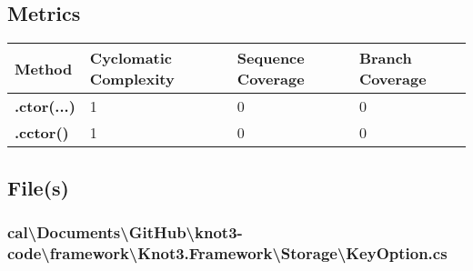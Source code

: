 \documentclass[a4paper,10pt]{article}
\begin{document}
\subsection{Metrics}
\begin{longtable}[l]{|l|l|l|l|}
\hline
\textbf{Method} & \textbf{Cyclomatic Complexity} & \textbf{Sequence Coverage} & \textbf{Branch Coverage}\\
\hline
\textbf{.ctor(...)} & 1 & 0 & 0\\
\hline
\textbf{.cctor()} & 1 & 0 & 0\\
\hline
\end{longtable}
\subsection{File(s)}
\subsubsection{cal\textbackslash Documents\textbackslash GitHub\textbackslash knot3-code\textbackslash framework\textbackslash Knot3.Framework\textbackslash Storage\textbackslash KeyOption.cs}
\end{document}
